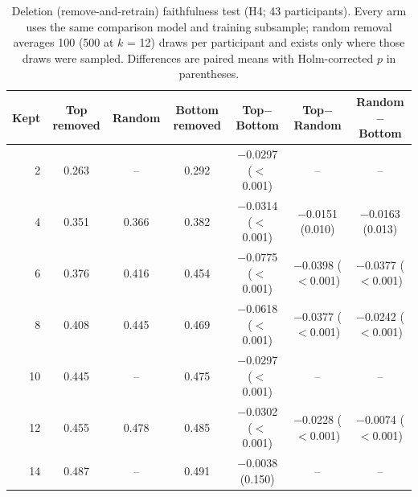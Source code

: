 \begin{table}[t]
\centering
\small
\caption{Deletion (remove-and-retrain) faithfulness test (H4; 43 participants). Every arm uses the same comparison model and training subsample; random removal averages 100 (500 at $k$ = 12) draws per participant and exists only where those draws were sampled. Differences are paired means with Holm-corrected $p$ in parentheses.}
\label{tab:faithfulness}
\begin{tabular}{rcccccc}
\toprule
Kept & Top removed & Random & Bottom removed & Top$-$Bottom & Top$-$Random & Random$-$Bottom \\
\midrule
2 & 0.263 & -- & 0.292 & $-$0.0297 ($<$0.001) & -- & -- \\
4 & 0.351 & 0.366 & 0.382 & $-$0.0314 ($<$0.001) & $-$0.0151 (0.010) & $-$0.0163 (0.013) \\
6 & 0.376 & 0.416 & 0.454 & $-$0.0775 ($<$0.001) & $-$0.0398 ($<$0.001) & $-$0.0377 ($<$0.001) \\
8 & 0.408 & 0.445 & 0.469 & $-$0.0618 ($<$0.001) & $-$0.0377 ($<$0.001) & $-$0.0242 ($<$0.001) \\
10 & 0.445 & -- & 0.475 & $-$0.0297 ($<$0.001) & -- & -- \\
12 & 0.455 & 0.478 & 0.485 & $-$0.0302 ($<$0.001) & $-$0.0228 ($<$0.001) & $-$0.0074 ($<$0.001) \\
14 & 0.487 & -- & 0.491 & $-$0.0038 (0.150) & -- & -- \\
\bottomrule
\end{tabular}
\end{table}
